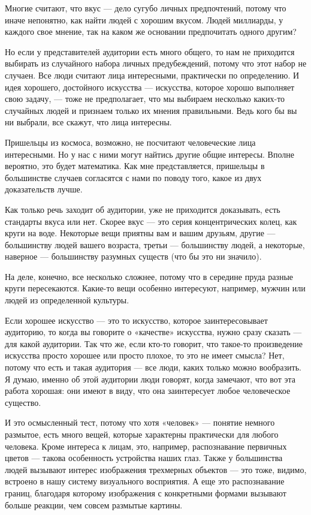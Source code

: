 \documentclass[ebook,12pt,oneside,openany]{memoir}
\begin{document}
Многие считают, что вкус — дело сугубо личных предпочтений, потому что
иначе непонятно, как найти людей с хорошим вкусом. Людей миллиарды, у
каждого свое мнение, так на каком же основании предпочитать одного
другим?

Но если у представителей аудитории есть много общего, то нам не
приходится выбирать из случайного набора личных предубеждений, потому
что этот набор не случаен. Все люди считают лица интересными,
практически по определению. И идея хорошего, достойного искусства —
искусства, которое хорошо выполняет свою задачу, — тоже не
предполагает, что мы выбираем несколько каких-то случайных людей и
признаем только их мнения правильными. Ведь кого бы вы ни выбрали, все
скажут, что лица интересны.

Пришельцы из космоса, возможно, не посчитают человеческие лица
интересными. Но у нас с ними могут найтись другие общие интересы.
Вполне вероятно, это будет математика. Как мне представляется,
пришельцы в большинстве случаев согласятся с нами по поводу того,
какое из двух доказательств лучше.

Как только речь заходит об аудитории, уже не приходится доказывать,
есть стандарты вкуса или нет. Скорее вкус — это серия концентрических
колец, как круги на воде. Некоторые вещи приятны вам и вашим друзьям,
другие — большинству людей вашего возраста, третьи — большинству
людей, а некоторые, наверное — большинству разумных существ (что бы
это ни значило).

На деле, конечно, все несколько сложнее, потому что в середине пруда
разные круги пересекаются. Какие-то вещи особенно интересуют,
например, мужчин или людей из определенной культуры.

Если хорошее искусство — это то искусство, которое заинтересовывает
аудиторию, то когда вы говорите о «качестве» искусства, нужно сразу
сказать — для какой аудитории. Так что же, если кто-то говорит, что
такое-то произведение искусства просто хорошее или просто плохое, то
это не имеет смысла? Нет, потому что есть и такая аудитория — все
люди, каких только можно вообразить. Я думаю, именно об этой аудитории
люди говорят, когда замечают, что вот эта работа хорошая: они имеют в
виду, что она заинтересует любое человеческое существо.

И это осмысленный тест, потому что хотя «человек» — понятие немного
размытое, есть много вещей, которые характерны практически для любого
человека. Кроме интереса к лицам, это, например, распознавание
первичных цветов — такова особенность устройства наших глаз. Также у
большинства людей вызывают интерес изображения трехмерных объектов —
это тоже, видимо, встроено в нашу систему визуального восприятия. А
еще это распознавание границ, благодаря которому изображения с
конкретными формами вызывают больше реакции, чем совсем размытые
картины.
\end{document}
